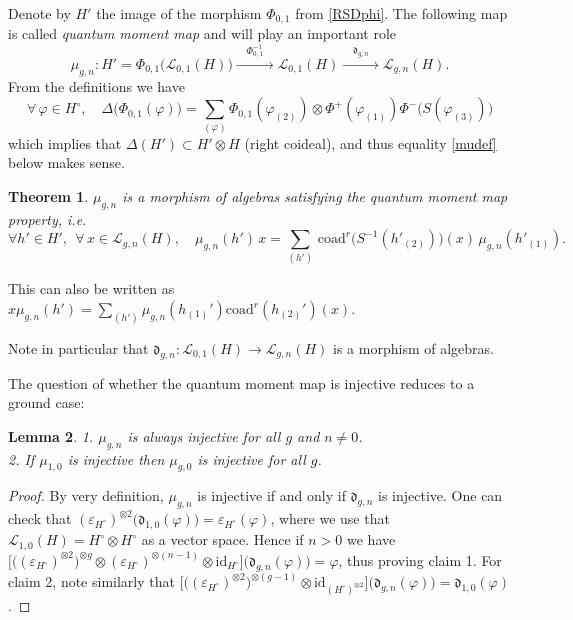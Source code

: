 \documentclass[11pt]{amsart}
\newtheorem{teo}{Theorem}[section]
\newtheorem{lem}[teo]{Lemma}
\begin{document}
\indent Denote by $H'$ the image of the morphism $\Phi_{0,1}$ from \eqref{RSDphi}. The following map is called {\em quantum moment map} and will play an important role
\begin{equation}\label{defQMMGen}
\mu_{g,n} : H' = \Phi_{0,1}\bigl( \mathcal{L}_{0,1}(H) \bigr) \xrightarrow{\quad\Phi_{0,1}^{-1}\quad} \mathcal{L}_{0,1}(H) \xrightarrow{\quad\mathfrak{d}_{g,n}\quad} \mathcal{L}_{g,n}(H).
\end{equation}
From the definitions we have
\begin{equation}\label{coproduitSurPhi01}
\forall \, \varphi \in H^\circ, \quad \Delta\bigl( \Phi_{0,1}(\varphi) \bigr) = \sum_{(\varphi)} \Phi_{0,1}(\varphi_{(2)}) \otimes \Phi^+(\varphi_{(1)})\Phi^-\bigl( S(\varphi_{(3)}) \bigr)
\end{equation}
which implies that $\Delta(H') \subset H' \otimes H$ (right coideal), and thus equality \eqref{mudef} below makes sense.
\begin{teo} {\em \cite[Th.\,7.14]{BFR}}
$\mu_{g,n}$ is a morphism of algebras satisfying the quantum moment map property, i.e.
\begin{equation}\label{mudef}
\forall h' \in H', \:\: \forall \, x \in \mathcal{L}_{g,n}(H), \quad \mu_{g,n}(h')\,x = \sum_{(h')} \, \mathrm{coad}^r\bigl(  S^{-1}(h'_{(2)}) \bigr)(x) \, \mu_{g,n}(h'_{(1)}).
\end{equation}
\end{teo}
\noindent This can also be written as $\textstyle x\mu_{g,n}(h') = \sum_{(h')} \mu_{g,n}(h_{(1)}')\mathrm{coad}^r(h_{(2)}')(x)$.

\noindent Note in particular that $\mathfrak{d}_{g,n} : \mathcal{L}_{0,1}(H) \to \mathcal{L}_{g,n}(H)$ is a morphism of algebras.

\smallskip

\indent The question of whether the quantum moment map is injective reduces to a ground case:

\begin{lem}\label{lemmaInjQMMtrivial}
1. $\mu_{g,n}$ is always injective for all $g$ and $n \neq 0$.
\\2. If $\mu_{1,0}$ is injective then $\mu_{g,0}$ is injective for all $g$.
\end{lem}
\begin{proof}
By very definition, $\mu_{g,n}$ is injective if and only if $\mathfrak{d}_{g,n}$ is injective. One can check that $(\varepsilon_{H^\circ})^{\otimes 2}\bigl( \mathfrak{d}_{1,0}(\varphi) \bigr) = \varepsilon_{H^\circ}(\varphi)$, where we use that $\mathcal{L}_{1,0}(H) = H^\circ \otimes H^\circ$ as a vector space. Hence if $n > 0$ we have $\bigl[ \bigl((\varepsilon_{H^\circ})^{\otimes 2}\bigr)^{\otimes g} \otimes (\varepsilon_{H^\circ})^{\otimes (n-1)} \otimes \mathrm{id}_{H^\circ}\bigr] \bigl( \mathfrak{d}_{g,n}(\varphi) \bigr) = \varphi$, thus proving claim 1. For claim 2, note similarly that $\bigl[ \bigl((\varepsilon_{H^\circ})^{\otimes 2}\bigr)^{\otimes (g-1)} \otimes \mathrm{id}_{(H^\circ)^{\otimes 2}}\bigr] \bigl( \mathfrak{d}_{g,n}(\varphi) \bigr) = \mathfrak{d}_{1,0}(\varphi)$.
\end{proof}
\end{document}
